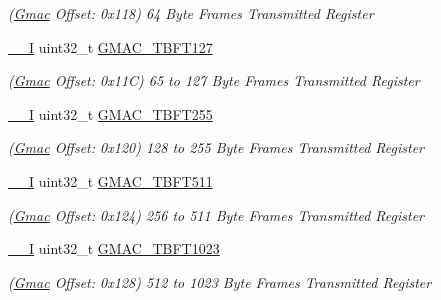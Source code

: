 \begin{DoxyCompactItemize}
\begin{DoxyCompactList}\small\item\em (\mbox{\hyperlink{structGmac}{Gmac}} Offset\+: 0x118) 64 Byte Frames Transmitted Register \end{DoxyCompactList}\item 
\mbox{\label{structGmac_a46e87b962bda097a1763e0845d7b595f}} 
\mbox{\hyperlink{core__cm7_8h_af63697ed9952cc71e1225efe205f6cd3}{\+\_\+\+\_\+I}} uint32\+\_\+t \mbox{\hyperlink{structGmac_a46e87b962bda097a1763e0845d7b595f}{G\+M\+A\+C\+\_\+\+T\+B\+F\+T127}}
\begin{DoxyCompactList}\small\item\em (\mbox{\hyperlink{structGmac}{Gmac}} Offset\+: 0x11C) 65 to 127 Byte Frames Transmitted Register \end{DoxyCompactList}\item 
\mbox{\label{structGmac_a81964a41d53b74d887cd5c3cbc9505e1}} 
\mbox{\hyperlink{core__cm7_8h_af63697ed9952cc71e1225efe205f6cd3}{\+\_\+\+\_\+I}} uint32\+\_\+t \mbox{\hyperlink{structGmac_a81964a41d53b74d887cd5c3cbc9505e1}{G\+M\+A\+C\+\_\+\+T\+B\+F\+T255}}
\begin{DoxyCompactList}\small\item\em (\mbox{\hyperlink{structGmac}{Gmac}} Offset\+: 0x120) 128 to 255 Byte Frames Transmitted Register \end{DoxyCompactList}\item 
\mbox{\label{structGmac_a548b254846228bfef34c33d8087dbd29}} 
\mbox{\hyperlink{core__cm7_8h_af63697ed9952cc71e1225efe205f6cd3}{\+\_\+\+\_\+I}} uint32\+\_\+t \mbox{\hyperlink{structGmac_a548b254846228bfef34c33d8087dbd29}{G\+M\+A\+C\+\_\+\+T\+B\+F\+T511}}
\begin{DoxyCompactList}\small\item\em (\mbox{\hyperlink{structGmac}{Gmac}} Offset\+: 0x124) 256 to 511 Byte Frames Transmitted Register \end{DoxyCompactList}\item 
\mbox{\label{structGmac_aa1b4b5216899a6c327a71c2e67eb2ba3}} 
\mbox{\hyperlink{core__cm7_8h_af63697ed9952cc71e1225efe205f6cd3}{\+\_\+\+\_\+I}} uint32\+\_\+t \mbox{\hyperlink{structGmac_aa1b4b5216899a6c327a71c2e67eb2ba3}{G\+M\+A\+C\+\_\+\+T\+B\+F\+T1023}}
\begin{DoxyCompactList}\small\item\em (\mbox{\hyperlink{structGmac}{Gmac}} Offset\+: 0x128) 512 to 1023 Byte Frames Transmitted Register \end{DoxyCompactList}\item 

\end{DoxyCompactItemize}
